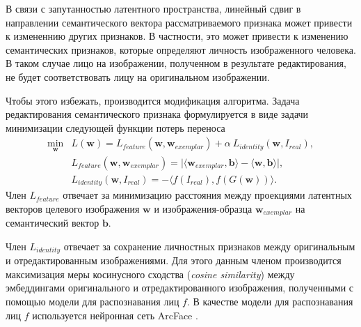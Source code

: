 \begin{enumerate}
В связи с запутанностью латентного пространства, линейный сдвиг в направлении семантического вектора рассматриваемого признака может привести к измененнию других признаков. 
В частности, это может привести к изменению семантических признаков, которые определяют личность изображенного человека. 
В таком случае лицо на изображении, полученном в результате редактирования, не будет соответствовать лицу на оригинальном изображении.

Чтобы этого избежать, производится модификация алгоритма. 
Задача редактирования семантического признака формулируется в виде задачи минимизации следующей функции потерь переноса
\begin{align*}
\min_{\mathbf w} &L(\mathbf w) = L_{feature}(\mathbf w, \mathbf w_{exemplar}) + \alpha~L_{identity}(\mathbf w, I_{real}), \\
&L_{feature}(\mathbf w, \mathbf w_{exemplar}) = \lvert \langle \mathbf w_{exemplar}, \mathbf b \rangle - \langle \mathbf w, \mathbf b \rangle \rvert,\\
&L_{identity}(\mathbf w, I_{real}) = - \langle f(I_{real}), f(G(\mathbf w)) \rangle.
\end{align*}
Член $L_{feature}$ отвечает за минимизацию расстояния между проекциями латентных векторов целевого изображения $\mathbf w$ и изображения-образца $\mathbf w_{exemplar}$ на семантический вектор $\mathbf b$.

Член $L_{identity}$ отвечает за сохранение личностных признаков между оригинальным и отредактированным изображениями. Для этого данным членом производится максимизация меры косинусного сходства (\emph{cosine similarity}) между эмбеддингами оригинального и отредактированного изображения, полученными с помощью модели для распознавания лиц $f$.
В качестве модели для распознавания лиц $f$ используется нейронная сеть ArcFace \cite{deng2018arcface}.


\end{enumerate}
